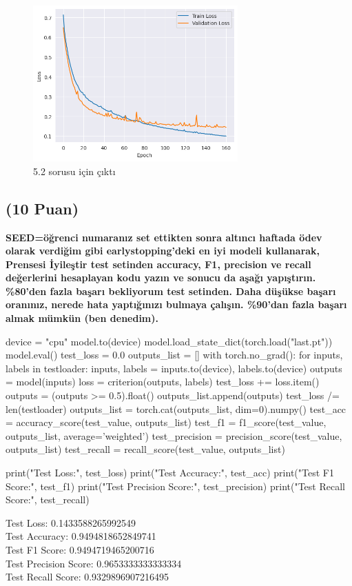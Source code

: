 \documentclass[11pt]{article}
\begin{document}

\begin{figure}[ht!]
    \centering
    \includegraphics[width=0.7\textwidth]{figure/mlpfigure.png}
    \caption{5.2 sorusu için çıktı}
    \label{fig:mlpfigure}
\end{figure}


\subsection{(10 Puan)} \textbf{SEED=öğrenci numaranız set ettikten sonra altıncı haftada ödev olarak verdiğim gibi earlystopping'deki en iyi modeli kullanarak, Prensesi İyileştir test setinden accuracy, F1, precision ve recall değerlerini hesaplayan kodu yazın ve sonucu da aşağı yapıştırın. \%80'den fazla başarı bekliyorum test setinden. Daha düşükse başarı oranınız, nerede hata yaptığınızı bulmaya çalışın. \%90'dan fazla başarı almak mümkün (ben denedim).}

\begin{python}
device = "cpu"
model.to(device)
model.load_state_dict(torch.load("last.pt"))
model.eval()
test_loss = 0.0
outputs_list = []
with torch.no_grad():
    for inputs, labels in testloader:
        inputs, labels = inputs.to(device), labels.to(device)
        outputs = model(inputs)
        loss = criterion(outputs, labels)
        test_loss += loss.item()
        outputs = (outputs >= 0.5).float()
        outputs_list.append(outputs)
test_loss /= len(testloader)
outputs_list = torch.cat(outputs_list, dim=0).numpy()
test_acc = accuracy_score(test_value, outputs_list)
test_f1 = f1_score(test_value, outputs_list, average='weighted')
test_precision = precision_score(test_value, outputs_list)
test_recall = recall_score(test_value, outputs_list)

print("Test Loss:", test_loss)
print("Test Accuracy:", test_acc)
print("Test F1 Score:", test_f1)
print("Test Precision Score:", test_precision)
print("Test Recall Score:", test_recall)
\end{python}
Test Loss: 0.1433588265992549\\
Test Accuracy: 0.9494818652849741\\
Test F1 Score: 0.9494719465200716\\
Test Precision Score: 0.9653333333333334\\
Test Recall Score: 0.9329896907216495
\end{document}
